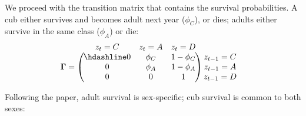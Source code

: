 \documentclass[
  12pt,
]{krantz}
\begin{document}
We proceed with the transition matrix that contains the survival probabilities. A cub either survives and becomes adult next year (\(\phi_C\)), or dies; adults either survive in the same class (\(\phi_A\)) or die:
\[\begin{matrix}
& \\
\mathbf{\Gamma} =
  \left ( \vphantom{ \begin{matrix} 12 \\ 12 \\ 12 \end{matrix} } \right .
          \end{matrix}
          \hspace{-1.2em}
          \begin{matrix}
          z_t=C & z_t=A & z_t=D \\ \hdashline
          0  & \phi_C & 1 - \phi_C\\
          0 & \phi_A & 1 - \phi_A\\
          0 & 0 & 1
          \end{matrix}
          \hspace{-0.2em}
          \begin{matrix}
          & \\
          \left . \vphantom{ \begin{matrix} 12 \\ 12 \\ 12 \end{matrix} } \right )
\begin{matrix}
z_{t-1}=C \\ z_{t-1}=A \\ z_{t-1}=D
\end{matrix}
\end{matrix}\]

Following the paper, adult survival is sex-specific; cub survival is common to both sexes:
\end{document}
